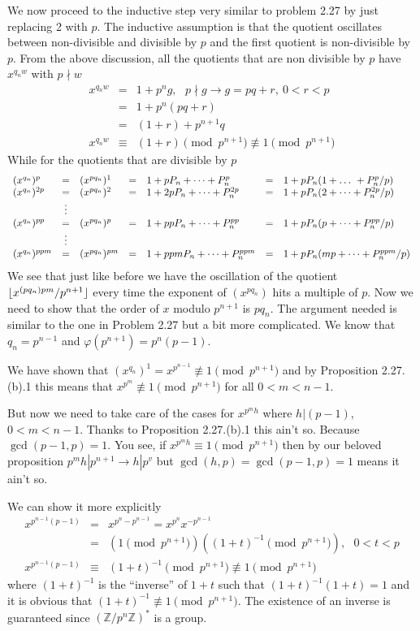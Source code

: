 \documentclass[aps,preprint,preprintnumbers,nofootinbib,showpacs,prd]{revtex4-1}
\newcommand{\nbea}{\begin{eqnarray*}}
\newcommand{\neea}{\end{eqnarray*}}
\DeclarePairedDelimiter{\floor}{\lfloor}{\rfloor}
\begin{document}
We now proceed to the inductive step very similar to problem 2.27 by just replacing 2 with $p$. The inductive assumption is that the quotient oscillates between non-divisible and divisible by $p$ and the first quotient is non-divisible by $p$. From the above discussion, all the quotients that are non divisible by $p$ have $x^{q_n w}$ with $p \nmid w$
%
\nbea
x^{q_n w} & = & 1 + p^n g, ~~~p\nmid g \to g = pq + r, ~ 0 < r < p \\
& = & 1 + p^n(pq + r) \\
& = & (1 + r) + p^{n+1}q \\
x^{q_n w} & \equiv & (1 + r) \pmod{p^{n+1}} \not\equiv 1 \pmod{p^{n+1}}
\neea
%
While for the quotients that are divisible by $p$
%
\nbea
\begin{array} {l c l c l c l}
(x^{q_n})^p & = & (x^{pq_n})^1 & = & 1 + pP_n + \dots +  P_n^p & = & 1 + pP_n(1 + \dots\ + P^p_n/p) \\
(x^{q_n})^{2p} & = & (x^{pq_n})^2 & = & 1 + 2pP_n + \dots + P_n^{2p} & = & 1 + pP_n(2 + \dots + P_n^{2p}/p) \\
& \vdots & & & & & \\
(x^{q_n})^{pp} & = & (x^{pq_n})^{p} & = & 1 + ppP_n + \dots + P_n^{pp} & = & 1 + pP_n(p + \dots + P_n^{pp}/p) \\
& \vdots & & & & & \\
(x^{q_n})^{ppm} & = & (x^{pq_n})^{pm} & = & 1 + ppmP_n + \dots + P_n^{ppm} & = & 1 + pP_n(mp + \dots + P_n^{ppm}/p)
\end{array}
\neea
%
We see that just like before we have the oscillation of the quotient $\floor{x^{(pq_n)pm}/p^{n+1}}$ every time the exponent of $(x^{pq_n})$ hits a multiple of $p$. Now we need to show that the order of $x$ modulo $p^{n+1}$ is $pq_n$. The argument needed is similar to the one in Problem 2.27 but a bit more complicated. We know that $q_n = p^{n-1}$ and $\varphi(p^{n+1}) = p^{n}(p-1)$.

We have shown that $(x^{q_n})^1  = x^{p^{n-1}} \not\equiv 1 \pmod{p^{n+1}}$ and by Proposition 2.27.(b).1 this means that $x^{p^m} \not\equiv 1 \pmod{p^{n+1}}$ for all $0 < m < n-1$.

But now we need to take care of the cases for $x^{p^m h}$ where $h | (p-1)$, $0 < m < n-1$. Thanks to Proposition 2.27.(b).1 this ain't so. Because $\gcd(p-1,p)=1$. You see, if $x^{p^m h} \equiv 1 \pmod{p^{n+1}}$ then by our beloved proposition $p^{m}h|p^{n+1} \to h | p^v$ but $\gcd(h,p)=\gcd(p-1,p)=1$ means it ain't so.

We can show it more explicitly
%
\nbea
x^{p^{n-1}(p-1)} & = & x^{p^{n}-p^{n-1}} = x^{p^{n}} x^{-p^{n-1}} \\
& = & (1 \pmod{p^{n+1}}) ((1+t)^{-1} \pmod{p^{n+1}}), ~~~ 0 < t < p \\
x^{p^{n-1}(p-1)} & \equiv & (1+t)^{-1} \pmod{p^{n+1}} \not\equiv 1 \pmod{p^{n+1}}
\neea
%
where $(1+t)^{-1}$ is the ``inverse'' of $1+t$ such that $ (1+t)^{-1}(1+t) = 1$ and it is obvious that $(1+t)^{-1} \not\equiv 1 \pmod{p^{n+1}}$. The existence of an inverse is guaranteed since $(\mathbb{Z}/p^{n}\mathbb{Z})^*$ is a group.
\end{document}
